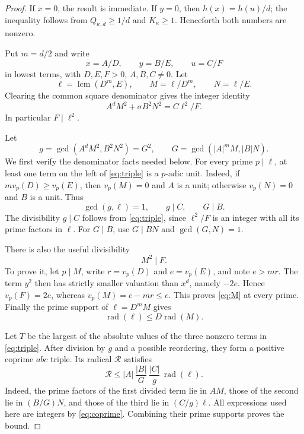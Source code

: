 \documentclass[11pt,a4paper]{article}
\DeclareMathOperator{\rad}{rad}
\begin{document}
\begin{proof}
If $x=0$, the result is immediate. If $y=0$, then
$h(x)=h(u)/d$; the inequality follows from
$Q_{\kappa,d}\ge1/d$ and $K_\kappa\ge1$.
Henceforth both numbers are nonzero.

Put $m=d/2$ and write
\[
 x=A/D,\qquad y=B/E,\qquad u=C/F
\]
in lowest terms, with $D,E,F>0$, $A,B,C\ne0$.
Let
\[
 \ell=\operatorname{lcm}(D^m,E),\qquad
 M=\ell/D^m,\qquad N=\ell/E.
\]
Clearing the common square denominator gives the integer identity
\begin{equation}\label{eq:triple}
 A^dM^2+\sigma B^2N^2=C\ell^2/F.
\end{equation}
In particular $F\mid\ell^2$.

Let
\[
 g=\gcd(A^dM^2,B^2N^2)=G^2,
 \qquad G=\gcd(|A|^mM,|B|N).
\]
We first verify the denominator facts needed below.
For every prime $p\mid\ell$, at least one term on the left of
\eqref{eq:triple} is a $p$-adic unit. Indeed, if
$m v_p(D)\ge v_p(E)$, then $v_p(M)=0$ and $A$ is a unit;
otherwise $v_p(N)=0$ and $B$ is a unit. Thus
\begin{equation}\label{eq:coprime}
 \gcd(g,\ell)=1,\qquad g\mid C,\qquad G\mid B.
\end{equation}
The divisibility $g\mid C$ follows from \eqref{eq:triple}, since
$\ell^2/F$ is an integer with all its prime factors in $\ell$.
For $G\mid B$, use $G\mid BN$ and $\gcd(G,N)=1$.

There is also the useful divisibility
\begin{equation}\label{eq:M}
 M^2\mid F.
\end{equation}
To prove it, let $p\mid M$, write $r=v_p(D)$ and $e=v_p(E)$,
and note $e>mr$. The term $y^2$ then has strictly smaller
valuation than $x^d$, namely $-2e$. Hence $v_p(F)=2e$, whereas
$v_p(M)=e-mr\le e$. This proves \eqref{eq:M} at every prime.
Finally the prime support of $\ell=D^mM$ gives
\begin{equation}\label{eq:radell}
 \rad(\ell)\le D\rad(M).
\end{equation}

Let $T$ be the largest of the absolute values of the three nonzero
terms in \eqref{eq:triple}. After division by $g$ and a possible
reordering, they form a positive coprime $abc$ triple. Its radical
$\mathcal R$ satisfies
\begin{equation}\label{eq:radical}
 \mathcal R
 \le |A|\,\frac{|B|}{G}\,\frac{|C|}{g}\,\rad(\ell).
\end{equation}
Indeed, the prime factors of the first divided term lie in $AM$,
those of the second lie in $(B/G)N$, and those of the third lie
in $(C/g)\ell$. All expressions used here are integers by
\eqref{eq:coprime}. Combining their prime supports proves the bound.


\end{proof}
\end{document}

